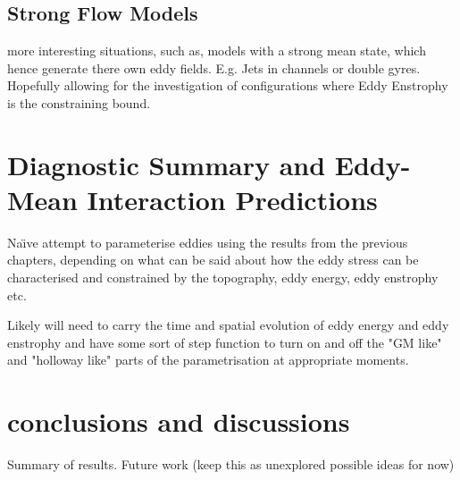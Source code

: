 \documentclass[10pt,a4paper]{article}
\begin{document}
\subsection{Strong Flow Models}

more interesting situations, such as, models
with a strong mean state, which hence
generate there own eddy fields. E.g. Jets in
channels or double gyres. Hopefully allowing 
for the investigation of configurations where 
Eddy Enstrophy is the constraining bound.


\section{Diagnostic Summary and Eddy-Mean Interaction Predictions}

Na\"{\i}ve attempt to parameterise eddies using the 
results from the previous chapters, depending
on what can be said about how the eddy stress can
be characterised and constrained by the topography,
eddy energy, eddy enstrophy etc. 

Likely will need to carry the time and spatial
evolution of eddy energy and eddy enstrophy and have
some sort of step function to turn on and off the
"GM like" and "holloway like" parts of the parametrisation at appropriate moments.


\section{conclusions and discussions}

Summary of results.
Future work (keep this as unexplored possible ideas for now)

	 \printbibliography
\end{document}
